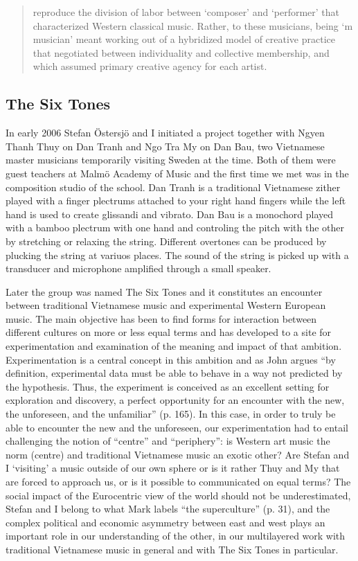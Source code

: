 \documentclass[a4paper]{article}
\begin{document}
\begin{quote}
  reproduce the division of labor between `composer' and `performer' that characterized Western classical   music. Rather, to these musicians, being `m musician' meant working out of a hybridized model of creative   practice that negotiated between individuality and collective membership, and which assumed primary   creative agency for each artist. \citep[p. 103][]{lewis2008}
\end{quote}

\subsection{The Six Tones}
\label{sec:tu-dai-oan}

In early 2006 Stefan Östersjö and I initiated a project together with Ngyen Thanh Thuy on Dan Tranh and Ngo Tra My on Dan Bau, two Vietnamese master musicians temporarily visiting Sweden at the time. Both of them were guest teachers at Malmö Academy of Music and the first time we met was in the composition studio of the school. Dan Tranh is a traditional Vietnamese zither played with a finger plectrums attached to your right hand fingers while the left hand is used to create glissandi and vibrato. Dan Bau is a monochord played with a bamboo plectrum with one hand and controling the pitch with the other by stretching or relaxing the string. Different overtones can be produced by plucking the string at variuos places. The sound of the string is picked up with a transducer and microphone amplified through a small speaker.

Later the group was named The Six Tones and it constitutes an encounter between traditional Vietnamese music and experimental Western European music. The main objective has been to find forms for interaction between different cultures on more or less equal terms and has developed to a site for experimentation and examination of the meaning and impact of that ambition. Experimentation is a central concept in this ambition and as John \citet{corbett2000} argues ``by definition, experimental data must be able to behave in a way not predicted by the hypothesis. Thus, the experiment is conceived as an excellent setting for exploration and discovery, a perfect opportunity for an encounter with the new, the unforeseen, and the unfamiliar'' (p. 165). In this case, in order to truly be able to encounter the new and the unforeseen, our experimentation had to entail challenging the notion of ``centre'' and ``periphery'': is Western art music the norm (centre) and traditional Vietnamese music an exotic other? Are Stefan and I `visiting' a music outside of our own sphere or is it rather Thuy and My that are forced to approach us, or is it possible to communicated on equal terms? The social impact of the Eurocentric view of the world should not be underestimated, Stefan and I belong to what Mark \citet{slobin1987} labels ``the superculture'' (p. 31), and the complex political and economic asymmetry between east and west plays an important role in our understanding of the other, in our multilayered work with traditional Vietnamese music in general and with The Six Tones in particular.
\end{document}

